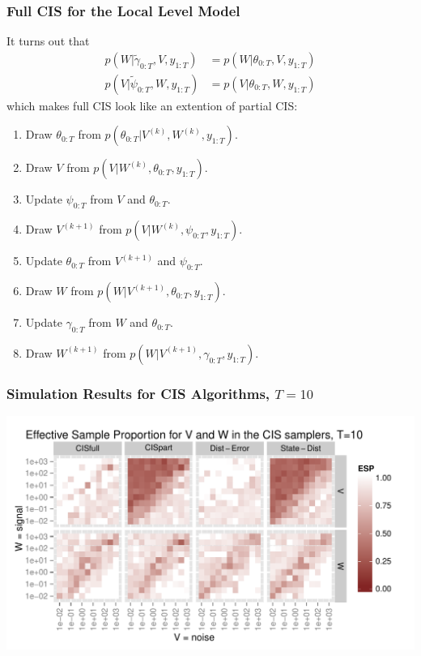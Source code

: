 \documentclass[xcolor=dvipsnames]{beamer}\usepackage{graphicx, color}
\newenvironment{knitrout}{}{} %
\begin{document}
\begin{frame}
    \frametitle{Full CIS for the Local Level Model}
It turns out that
\begin{align*}
  p(W|\tilde{\gamma}_{0:T}, V, y_{1:T}) &= p(W|\theta_{0:T}, V, y_{1:T})\\
  p(V|\tilde{\psi}_{0:T}, W, y_{1:T}) &= p(V|\theta_{0:T}, W, y_{1:T})
\end{align*}
\pause 
which makes full CIS look like an extention of partial CIS:
\begin{enumerate}
  \item Draw $\theta_{0:T}$ from $p(\theta_{0:T}|V^{(k)},W^{(k)},y_{1:T})$.
  \item Draw $V$ from $p(V|W^{(k)}, \theta_{0:T}, y_{1:T})$.
  \item Update $\psi_{0:T}$ from $V$ and $\theta_{0:T}$.
  \item Draw $V^{(k+1)}$ from $p(V|W^{(k)}, \psi_{0:T}, y_{1:T})$.
  \item Update $\theta_{0:T}$ from $V^{(k+1)}$ and $\psi_{0:T}$.
  \item Draw $W$ from $p(W|V^{(k+1)}, \theta_{0:T}, y_{1:T})$.
  \item Update $\gamma_{0:T}$ from $W$ and $\theta_{0:T}$.
  \item Draw $W^{(k+1)}$ from $p(W|V^{(k+1)}, \gamma_{0:T}, y_{1:T})$.
\end{enumerate}
\end{frame}





\begin{frame}
\frametitle{Simulation Results for CIS Algorithms, $T=10$}
\begin{knitrout}\footnotesize
{}\color{fgcolor}
\includegraphics[width=1\textwidth]{figure/cisESplotT10} 

\end{knitrout}

\end{frame}
\end{document}
